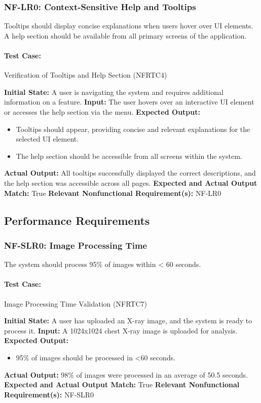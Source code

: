 \documentclass[12pt, titlepage]{article}
\begin{document}
\subsubsection{NF-LR0: Context-Sensitive Help and Tooltips}
Tooltips should display concise explanations when users hover over UI elements.  
A help section should be available from all primary screens of the application.

\paragraph{Test Case:} Verification of Tooltips and Help Section (NFRTC4)

\textbf{Initial State:} A user is navigating the system and requires additional information on a feature.  
\textbf{Input:} The user hovers over an interactive UI element or accesses the help section via the menu.  
\textbf{Expected Output:}
\begin{itemize}
    \item Tooltips should appear, providing concise and relevant explanations for the selected UI element.
    \item The help section should be accessible from all screens within the system.
\end{itemize}
\textbf{Actual Output:} All tooltips successfully displayed the correct descriptions, and the help section was accessible across all pages.  
\textbf{Expected and Actual Output Match:} True  
\textbf{Relevant Nonfunctional Requirement(s):} NF-LR0  

\subsection{Performance Requirements}

\subsubsection{NF-SLR0: Image Processing Time}
The system should process 95\% of images within < 60 seconds.

\paragraph{Test Case:} Image Processing Time Validation (NFRTC7)

\textbf{Initial State:} A user has uploaded an X-ray image, and the system is ready to process it.  
\textbf{Input:} A 1024x1024 chest X-ray image is uploaded for analysis.  
\textbf{Expected Output:}
\begin{itemize}
    \item 95\% of images should be processed in <60 seconds.
\end{itemize}
\textbf{Actual Output:} 98\% of images were processed in an average of 50.5 seconds.  
\textbf{Expected and Actual Output Match:} True  
\textbf{Relevant Nonfunctional Requirement(s):} NF-SLR0  
\end{document}
